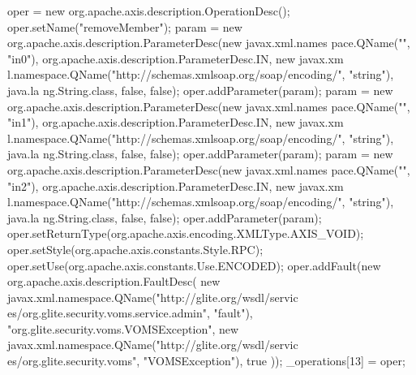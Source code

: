 \begin{DoxyCode}
{        oper = new org.apache.axis.description.OperationDesc();
        oper.setName("removeMember");
        param = new org.apache.axis.description.ParameterDesc(new javax.xml.names
      pace.QName("", "in0"), org.apache.axis.description.ParameterDesc.IN, new javax.xm
      l.namespace.QName("http://schemas.xmlsoap.org/soap/encoding/", "string"), java.la
      ng.String.class, false, false);
        oper.addParameter(param);
        param = new org.apache.axis.description.ParameterDesc(new javax.xml.names
      pace.QName("", "in1"), org.apache.axis.description.ParameterDesc.IN, new javax.xm
      l.namespace.QName("http://schemas.xmlsoap.org/soap/encoding/", "string"), java.la
      ng.String.class, false, false);
        oper.addParameter(param);
        param = new org.apache.axis.description.ParameterDesc(new javax.xml.names
      pace.QName("", "in2"), org.apache.axis.description.ParameterDesc.IN, new javax.xm
      l.namespace.QName("http://schemas.xmlsoap.org/soap/encoding/", "string"), java.la
      ng.String.class, false, false);
        oper.addParameter(param);
        oper.setReturnType(org.apache.axis.encoding.XMLType.AXIS_VOID);
        oper.setStyle(org.apache.axis.constants.Style.RPC);
        oper.setUse(org.apache.axis.constants.Use.ENCODED);
        oper.addFault(new org.apache.axis.description.FaultDesc(
                      new javax.xml.namespace.QName("http://glite.org/wsdl/servic
      es/org.glite.security.voms.service.admin", "fault"),
                      "org.glite.security.voms.VOMSException",
                      new javax.xml.namespace.QName("http://glite.org/wsdl/servic
      es/org.glite.security.voms", "VOMSException"), 
                      true
                     ));
        _operations[13] = oper;

}
\end{DoxyCode}
